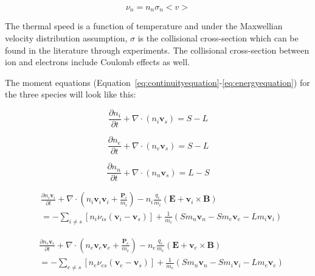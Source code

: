\documentclass[12pt,upcase]{umlthesis}
\begin{document}
\begin{equation}\label{eq:collisionrate}
	\nu_n = n_n \sigma_n <v>
\end{equation}

The thermal speed is a function of temperature and under the Maxwellian velocity distribution assumption, $\sigma$ is the collisional cross-section which can be found in the literature through experiments. The collisional cross-section between ion and electrons include Coulomb effects as well.

The moment equations (Equation~\ref{eq:continuityequation}-\ref{eq:energyequation}) for the three species will look like this:

\begin{equation}\label{eq:icontinuity}
	\frac{\partial n_i}{\partial t} + \nabla \cdot (n_i \textbf{v}_s) = S - L
\end{equation}

\begin{equation}\label{eq:econtinuity}
	\frac{\partial n_e}{\partial t} + \nabla \cdot (n_e \textbf{v}_s) = S - L
\end{equation}

\begin{equation}\label{eq:ncontinuity}
	\frac{\partial n_n}{\partial t} + \nabla \cdot (n_n \textbf{v}_s) = L - S
\end{equation}

\begin{equation}\label{eq:imomentum}
	\begin{aligned}
	& \frac{\partial n_i \textbf{v}_i}{\partial t} + \nabla \cdot (n_i \textbf{v}_i \textbf{v}_i + \frac{\textbf{P}_i}{m_i} ) - n_i \frac{q_i}{m_i}(\textbf{E} + \textbf{v}_i \times \textbf{B}) \\
	& = - \sum_{i \neq s} [n_i \nu_{is}(\textbf{v}_i - \textbf{v}_s)] + \frac{1}{m_i} (S m_n \textbf{v}_n - S m_e \textbf{v}_e -L m_i \textbf{v}_i)
\end{aligned}
\end{equation}

\begin{equation}\label{eq:emomentum}
	\begin{aligned}
	& \frac{\partial n_e \textbf{v}_e}{\partial t} + \nabla \cdot (n_e \textbf{v}_e \textbf{v}_e + \frac{\textbf{P}_e}{m_e} ) - n_e \frac{q_e}{m_e}(\textbf{E} + \textbf{v}_e \times \textbf{B}) \\
	& = - \sum_{e \neq s} [n_e \nu_{es}(\textbf{v}_e - \textbf{v}_s)] + \frac{1}{m_e} (S m_n \textbf{v}_n - S m_i \textbf{v}_i - L m_e \textbf{v}_e)
\end{aligned}
\end{equation}
\end{document}
